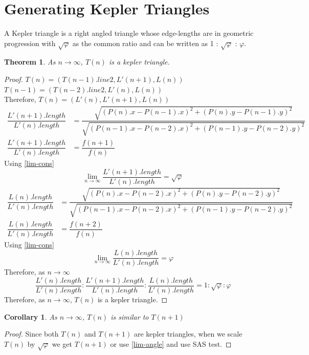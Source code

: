 \documentclass{article}
\newtheorem{theorem}{Theorem}[section]
\newtheorem{corollary}{Corollary}[theorem]
\begin{document}
\section{Generating Kepler Triangles}
A Kepler triangle is a right angled triangle whose edge-lengths are in geometric progression with $\sqrt{\varphi}$ as the common ratio and can be written as 1 : $\sqrt{\varphi}$ : $\varphi$\cite{KT-wiki}.
\begin{theorem}
	As $n \to \infty$, $T(n)$ is a kepler triangle.
\end{theorem}
\begin{proof}
	$T(n) = (T(n-1).line2, L'(n+1), L(n))$\\
	$T(n-1) = (T(n-2).line2, L'(n), L(n))$\\
	Therefore, $T(n) = (L'(n), L'(n+1), L(n))$
	\begin{align*}
		\dfrac{L'(n+1).length}{L'(n).length} &= \dfrac{\sqrt{(P(n).x - P(n-1).x)^2 + (P(n).y-P(n-1).y)^2}}{\sqrt{(P(n-1).x - P(n-2).x)^2 + (P(n-1).y-P(n-2).y)^2}}\\
		\dfrac{L'(n+1).length}{L'(n).length} &= \dfrac{f(n+1)}{f(n)}
	\end{align*}
	Using \ref{lim-cons}
	$$\lim_{n \to \infty} \dfrac{L'(n+1).length}{L'(n).length} = \sqrt{\varphi}$$
	\begin{align*}
	\dfrac{L(n).length}{L'(n).length} &= \dfrac{\sqrt{(P(n).x - P(n-2).x)^2 + (P(n).y-P(n-2).y)^2}}{\sqrt{(P(n-1).x - P(n-2).x)^2 + (P(n-1).y-P(n-2).y)^2}}\\
	\dfrac{L(n).length}{L'(n).length} &= \dfrac{f(n+2)}{f(n)}
	\end{align*}
	Using \ref{lim-cons}
	$$\lim_{n \to \infty} \dfrac{L(n).length}{L'(n).length} = \varphi$$
	Therefore, as $n \to \infty$
	$$\dfrac{L'(n).length}{L'(n).length} : \dfrac{L'(n+1).length}{L'(n).length} : \dfrac{L(n).length}{L'(n).length} = 1 : \sqrt{\varphi} : \varphi $$
	Therefore, as $n \to \infty$, $T(n)$ is a kepler triangle.
\end{proof}
\begin{corollary}
	As $n \to \infty$, $T(n)$ is similar to $T(n+1)$
\end{corollary}
\begin{proof}
	Since both $T(n)$ and $T(n+1)$ are kepler triangles, when we scale $T(n)$ by $\sqrt{\varphi}$ we get $T(n+1)$ or use \ref{lim-angle} and use SAS test.
\end{proof}
\end{document}
